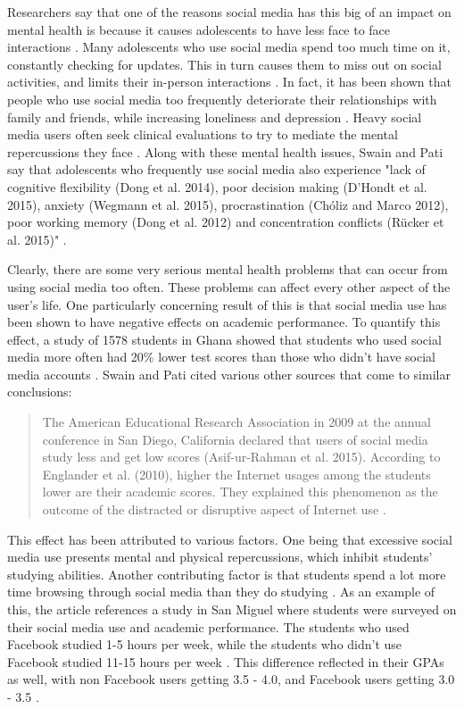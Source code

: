 \documentclass[12pt, journal, compsoc]{IEEEtran}
\begin{document}
Researchers say that one of the reasons social media has this big of an impact on mental health is because it causes adolescents to have less face to face interactions \cite{Repercussions}. Many adolescents who use social media spend too much time on it, constantly checking for updates. This in turn causes them to miss out on social activities, and limits their in-person interactions \cite{Repercussions}. In fact, it has been shown that people who use social media too frequently deteriorate their relationships with family and friends, while increasing loneliness and depression \cite{Repercussions}. Heavy social media users often seek clinical evaluations to try to mediate the mental repercussions they face \cite{Repercussions}. Along with these mental health issues, Swain and Pati say that adolescents who frequently use social media also experience "lack of cognitive flexibility (Dong et al. 2014), poor decision making (D’Hondt et al. 2015), anxiety (Wegmann et al. 2015), procrastination (Chóliz and Marco 2012), poor working memory (Dong et al. 2012) and concentration conflicts (Rücker et al. 2015)" \cite{Repercussions}.

Clearly, there are some very serious mental health problems that can occur from using social media too often. These problems can affect every other aspect of the user's life. One particularly concerning result of this is that social media use has been shown to have negative effects on academic performance. To quantify this effect, a study of 1578 students in Ghana showed that students who used social media more often had 20\% lower test scores than those who didn't have social media accounts \cite{Repercussions}. Swain and Pati cited various other sources that come to similar conclusions:
\begin{quote}
    The American Educational Research Association in 2009 at the annual conference in San Diego, California declared that users of social media study less and get low scores (Asif-ur-Rahman et al. 2015). According to Englander et al. (2010), higher the Internet usages among the students lower are their academic scores. They explained this phenomenon as the outcome of the distracted or disruptive aspect of Internet use \cite{Repercussions}.
\end{quote} 

This effect has been attributed to various factors. One being that excessive social media use presents mental and physical repercussions, which inhibit students' studying abilities. Another contributing factor is that students spend a lot more time browsing through social media than they do studying \cite{Repercussions}. As an example of this, the article references a study in San Miguel where students were surveyed on their social media use and academic performance. The students who used Facebook studied 1-5 hours per week, while the students who didn't use Facebook studied 11-15 hours per week \cite{Repercussions}. This difference reflected in their GPAs as well, with non Facebook users getting 3.5 - 4.0, and Facebook users getting 3.0 - 3.5 \cite{Repercussions}. 
\end{document}
